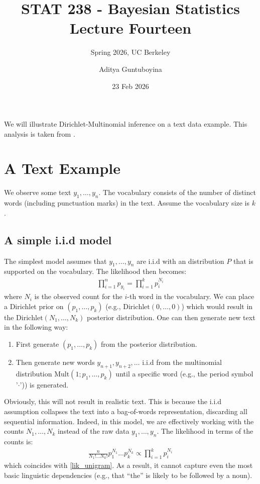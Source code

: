 \documentclass{scrartcl}
\begin{document}
\title{STAT 238 - Bayesian Statistics  \\
  Lecture Fourteen} 
\subtitle{Spring 2026, UC Berkeley}

\author{Aditya Guntuboyina}


\date{23 Feb 2026}

\maketitle


We will illustrate Dirichlet-Multinomial inference on a text data
example. This analysis is taken from
\citet{MacKay1995HierarchicalDirichlet}. 

\section{A Text Example}

We observe some text $y_1, \dots, y_n$. The vocabulary consists of the
number of distinct words (including punctuation marks) in the
text. Assume the vocabulary size is $k$.

\subsection{A simple i.i.d model}

The simplest model assumes that $y_1, \dots, y_n$ are i.i.d with an
distribution $P$ that is supported on the vocabulary. The likelihood
then becomes:
\begin{align}\label{lik_unigram}
 \prod_{i=1}^n p_{y_i} = \prod_{i=1}^k p_i^{N_i}
\end{align}
where $N_i$ is the observed count for the $i$-th word in the
vocabulary. We can place a Dirichlet prior on $(p_1, \dots, p_k)$
(e.g., $\text{Dirichlet}(0, \dots, 0)$) which would result in the
$\text{Dirichlet}(N_1, \dots, N_k)$  posterior distribution. One can
then generate new text in the following way:
\begin{enumerate}
\item First generate $(p_1, \dots, p_k)$ from the posterior
  distribution.
\item Then generate new words $y_{n+1}, y_{n+2}, \dots$ i.i.d from the
  multinomial distribution $\text{Mult}(1; p_1, \dots, p_k)$ until a
  specific word (e.g., the period symbol '$\cdot$')) is generated. 
\end{enumerate}
Obviously, this will not result in realistic text. This is because the
i.i.d assumption collapses the text into a bag-of-words
representation, discarding all sequential information. Indeed, in this
model, we are effectively working with the counts 
$N_1, \dots, N_k$ instead of the raw data $y_1, \dots, y_n$. The
likelihood in terms of the counts is:
\begin{align*}
  \frac{n}{N_1! \dots N_k!} p_1^{N_1} \dots p_k^{N_k} \propto
  \prod_{i=1}^k p_i^{N_i}
\end{align*}
which coincides with \eqref{lik_unigram}. As a result, it cannot
capture even the most basic linguistic dependencies (e.g., that
``the'' is likely to be followed by a noun). 
\end{document}
